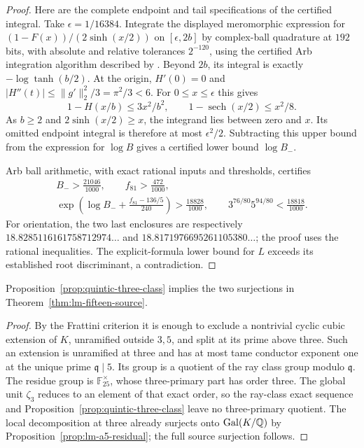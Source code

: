\begin{proof}
Here are the complete endpoint and tail specifications of the
certified integral. Take $\epsilon=1/16384$. Integrate the displayed
meromorphic expression for $(1-F(x))/(2\sinh(x/2))$ on
$[\epsilon,2b]$ by complex-ball quadrature at $192$ bits, with
absolute and relative tolerances $2^{-120}$, using the certified
Arb integration algorithm described by \citet{Johansson2018}.
Beyond $2b$, its integral is exactly $-\log\tanh(b/2)$.
At the origin, $H'(0)=0$ and
$|H''(t)|\le\|g'\|_2^2/3=\pi^2/3<6$.
For $0\le x\le\epsilon$ this gives
\[
 1-H(x/b)\le3x^2/b^2,
 \qquad 1-\operatorname{sech}(x/2)\le x^2/8.
\]
As $b\ge2$ and $2\sinh(x/2)\ge x$, the integrand lies between
zero and $x$. Its omitted endpoint integral is therefore at most
$\epsilon^2/2$. Subtracting this upper bound from the expression
for $\log B$ gives a certified lower bound $\log B_-$.

Arb ball arithmetic, with exact rational inputs and thresholds,
certifies
\begin{gather*}
 B_->\frac{21046}{1000},\qquad f_{81}>\frac{472}{1000},\\
 \exp\!\left(\log B_-+\frac{f_{81}-136/5}{240}\right)
       >\frac{18828}{1000},\qquad
 3^{76/80}5^{94/80}<\frac{18818}{1000}.
\end{gather*}
For orientation, the two last enclosures are respectively
$18.8285116161758712974\ldots$ and
$18.8171976695261105380\ldots$; the proof uses the rational
inequalities. The explicit-formula lower bound for $L$ exceeds
its established root discriminant, a contradiction.
\end{proof}

\begin{corollary}
\label{cor:quintic-ray-source}
Proposition~\ref{prop:quintic-three-class} implies the two
surjections in Theorem~\ref{thm:lm-fifteen-source}.
\end{corollary}
\begin{proof}
By the Frattini criterion it is enough to exclude a nontrivial cyclic
cubic extension of $K$, unramified outside $3,5$, and split at its
prime above three. Such an extension is unramified at three and
has at most tame conductor exponent one at the unique prime
$\mathfrak q\mid5$. Its group is a quotient of the ray class group
modulo $\mathfrak q$. The residue group is $\mathbb F_{25}^{\times}$,
whose three-primary part has order three. The global unit $\zeta_3$
reduces to an element of that exact order, so the ray-class exact
sequence and Proposition~\ref{prop:quintic-three-class} leave no
three-primary quotient. The local decomposition at three already
surjects onto $\operatorname{Gal}(K/\mathbb Q)$ by
Proposition~\ref{prop:lm-a5-residual}; the full source surjection follows.
\end{proof}
